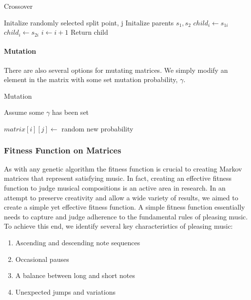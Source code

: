 \documentclass{article}
\begin{document}
\begin{algorithm}[H]
  \caption{Crossover}
  \begin{algorithmic}
    \State Initalize randomly selected split point, j
    \State Initalize parents $s_1, s_2$
    \State $child_i \gets s_{1i}$
    \EndIf
    \State $child_i \gets s_{2i}$
    \EndIf
    \State $i \gets i + 1$
    \EndWhile
    \State Return child  
  \end{algorithmic}
\end{algorithm}


\paragraph{Mutation} There are also several options for mutating matrices. We simply modify an element in the matrix with some set mutation probability, $\gamma$.

\begin{algorithm}[H]
  \caption{Mutation}
  \begin{algorithmic}
    \State Assume some $\gamma$ has been set

    \State $matrix[i][j] \gets $ random new probability
    \EndIf
    \EndWhile
    \EndWhile
  \end{algorithmic}
\end{algorithm}


\subsubsection{Fitness Function on Matrices}

As with any genetic algorithm the fitness function is crucial to creating Markov matrices that represent satisfying music. In fact, creating an effective fitness function to judge musical compositions is an active area in research. In an attempt to preserve creativity and allow a wide variety of results, we aimed to create a simple yet effective fitness function. A simple fitness function essentially needs to capture and judge adherence to the fundamental rules of pleasing music. To achieve this end, we identify several key characteristics of pleasing music:

\begin{enumerate}
\item Ascending and descending note sequences
\item Occasional pauses
\item A balance between long and short notes
\item Unexpected jumps and variations
\end{enumerate}
\end{document}
